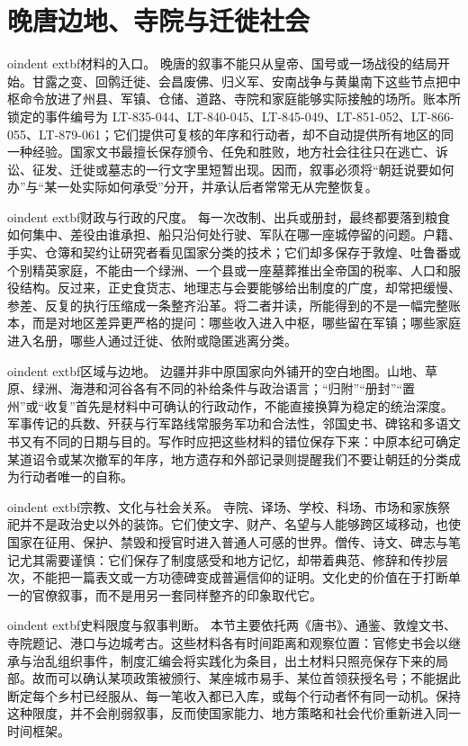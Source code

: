 \section{晚唐边地、寺院与迁徙社会}
\label{sec:late-tang-frontier-religion}

oindent	extbf{材料的入口。} 晚唐的叙事不能只从皇帝、国号或一场战役的结局开始。甘露之变、回鹘迁徙、会昌废佛、归义军、安南战争与黄巢南下这些节点把中枢命令放进了州县、军镇、仓储、道路、寺院和家庭能够实际接触的场所。账本所锁定的事件编号为 LT-835-044、LT-840-045、LT-845-049、LT-851-052、LT-866-055、LT-879-061；它们提供可复核的年序和行动者，却不自动提供所有地区的同一种经验。国家文书最擅长保存颁令、任免和胜败，地方社会往往只在逃亡、诉讼、征发、迁徙或墓志的一行文字里短暂出现。因而，叙事必须将“朝廷说要如何办”与“某一处实际如何承受”分开，并承认后者常常无从完整恢复。


oindent	extbf{财政与行政的尺度。} 每一次改制、出兵或册封，最终都要落到粮食如何集中、差役由谁承担、船只沿何处行驶、军队在哪一座城停留的问题。户籍、手实、仓簿和契约让研究者看见国家分类的技术；它们却多保存于敦煌、吐鲁番或个别精英家庭，不能由一个绿洲、一个县或一座墓葬推出全帝国的税率、人口和服役结构。反过来，正史食货志、地理志与会要能够给出制度的广度，却常把缓慢、参差、反复的执行压缩成一条整齐沿革。将二者并读，所能得到的不是一幅完整账本，而是对地区差异更严格的提问：哪些收入进入中枢，哪些留在军镇；哪些家庭进入名册，哪些人通过迁徙、依附或隐匿逃离分类。


oindent	extbf{区域与边地。} 边疆并非中原国家向外铺开的空白地图。山地、草原、绿洲、海港和河谷各有不同的补给条件与政治语言；“归附”“册封”“置州”或“收复”首先是材料中可确认的行政动作，不能直接换算为稳定的统治深度。军事传记的兵数、歼获与行军路线常服务军功和合法性，邻国史书、碑铭和多语文书又有不同的日期与目的。写作时应把这些材料的错位保存下来：中原本纪可确定某道诏令或某次撤军的年序，地方遗存和外部记录则提醒我们不要让朝廷的分类成为行动者唯一的自称。


oindent	extbf{宗教、文化与社会关系。} 寺院、译场、学校、科场、市场和家族祭祀并不是政治史以外的装饰。它们使文字、财产、名望与人能够跨区域移动，也使国家在征用、保护、禁毁和授官时进入普通人可感的世界。僧传、诗文、碑志与笔记尤其需要谨慎：它们保存了制度感受和地方记忆，却带着典范、修辞和传抄层次，不能把一篇表文或一方功德碑变成普遍信仰的证明。文化史的价值在于打断单一的官僚叙事，而不是用另一套同样整齐的印象取代它。


oindent	extbf{史料限度与叙事判断。} 本节主要依托两《唐书》、通鉴、敦煌文书、寺院题记、港口与边城考古。这些材料各有时间距离和观察位置：官修史书会以继承与治乱组织事件，制度汇编会将实践化为条目，出土材料只照亮保存下来的局部。故而可以确认某项政策被颁行、某座城市易手、某位首领获授名号；不能据此断定每个乡村已经服从、每一笔收入都已入库，或每个行动者怀有同一动机。保持这种限度，并不会削弱叙事，反而使国家能力、地方策略和社会代价重新进入同一时间框架。

